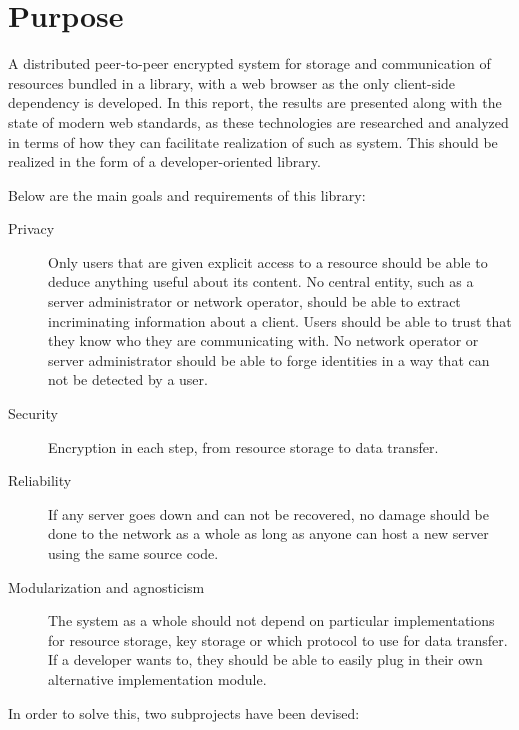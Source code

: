 \section{Purpose}\label{sec:purpose}


A distributed peer-to-peer encrypted system for storage and communication of resources bundled in a library, with a web browser as the only client-side dependency is developed. In this report, the results are presented along with the state of modern web standards, as these technologies are researched and analyzed in terms of how they can facilitate realization of such as system. This should be realized in the form of a developer-oriented library.

Below are the main goals and requirements of this library:

\begin{description}
  \item[Privacy] Only users that are given explicit access to a resource should be able to deduce anything useful about its content. No central entity, such as a server administrator or network operator, should be able to extract incriminating information about a client. Users should be able to trust that they know who they are communicating with. No network operator or server administrator should be able to forge identities in a way that can not be detected by a user.

\item[Security] Encryption in each step, from resource storage to data transfer.

\item[Reliability] If any server goes down and can not be recovered, no damage should be done to the network as a whole as long as anyone can host a new server using the same source code.

\item[Modularization and agnosticism] The system as a whole should not depend on particular implementations for resource storage, key storage or which protocol to use for data transfer. If a developer wants to, they should be able to easily plug in their own alternative implementation module.

\end{description}

In order to solve this, two subprojects have been devised:

